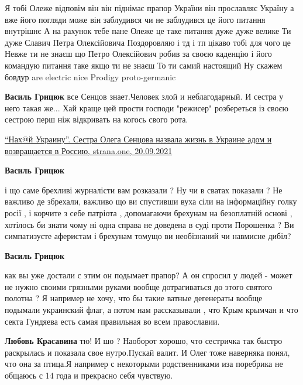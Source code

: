 \begin{itemize}
\begin{itemize}
\end{itemize} %


Я тобі Олеже відповім він він піднімає прапор України він прославляє Україну а
вже його погляди може він заблудився чи не заблудився це його питання внутрішнє
А на рахунок тебе пане Олеже це таке питання дуже дуже велике Ти дуже Славич
Петра Олексійовича Поздоровляю і тд і тп цікаво тобі для чого це Невже ти не
знаєш що Петро Олексійович робив за своєю каденцію і його командую питання таке
якщо ти не знаєш То ти самий настоящий Ну скажем бовдур are electric nice
Prodigy proto-germanic

\begin{itemize} %
\textbf{Василь Грицюк} все Сенцов знает.Человек злой и неблагодарный. И сестра у него такая же...
Хай краще цей прости господи "режисер" розбереться із своєю сестрою перш ніж відкривать на когось свого рота.

\href{https://strana.one/news/354204-sestra-sentsova-nazvala-zhizn-v-ukraine-adom-i-vozvrashchaetsja-v-rossiju.html}{%
\enquote{Нах@й Украину}. Сестра Олега Сенцова назвала жизнь в Украине адом и возвращается в Россию, strana.one, 20.09.2021%
}

\textbf{Василь Грицюк} 

і що саме брехливі журналісти вам розказали ? Ну чи в сватах показали ? Не
важливо де збрехали, важливо що ви спустивши вуха сіли на інформаційну голку
росії , і корчите з себе патріота , допомагаючи брехунам на безоплатній основі
, хотілось би знати чому ні одна справа не доведена в суді проти Порошенка ? Ви
симпатизуєте аферистам і брехунам томущо ви необізнаний чи навмисне дибіл?


\textbf{Василь Грицюк} 

как вы уже достали с этим он подымает прапор? А он спросил у людей - может не
нужно своими грязными руками вообще дотрагиваться до этого святого полотна ? Я
например не хочу, что бы такие ватные дегенераты вообще подымали украинский
флаг, а потом нам рассказывали , что Крым крымчан и что секта Гундяева есть
самая правильная во всем православии.

\textbf{Любовь Красавина} тю! И шо ? Наоборот хорошо, что сестричка так быстро раскрылась и показала свое нутро.Пускай валит. И Олег тоже наверняка понял, что она за птица.Я например с некоторыми родственниками иза поребрика не общаюсь с 14 года и прекрасно себя чувствую.


\end{itemize}
\end{itemize}

